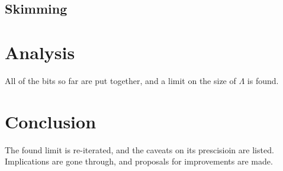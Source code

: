 \begin{english}
\section{Skimming}


\chapter{Analysis}
All of the bits so far are put together, and a limit on the size of
$\Lambda$ is found.

\chapter{Conclusion}
The found limit is re-iterated, and the caveats on its prescisioin are
listed. Implications are gone through, and proposals for improvements
are made.

\renewcommand{\bibname}{References}



\end{english}

